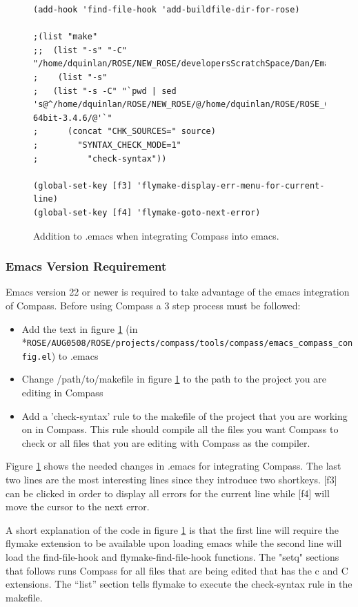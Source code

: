 \begin{figure}
{\begin{verbatim}
(add-hook 'find-file-hook 'add-buildfile-dir-for-rose)

;(list "make"
;;  (list "-s" "-C" "/home/dquinlan/ROSE/NEW_ROSE/developersScratchSpace/Dan/EmacsCompass_tests/"
;    (list "-s"
;   (list "-s -C" "`pwd | sed 's@^/home/dquinlan/ROSE/NEW_ROSE/@/home/dquinlan/ROSE/ROSE_CompileTree/LINUX-64bit-3.4.6/@'`"
;	   (concat "CHK_SOURCES=" source)
;	     "SYNTAX_CHECK_MODE=1"
;		   "check-syntax"))

(global-set-key [f3] 'flymake-display-err-menu-for-current-line)
(global-set-key [f4] 'flymake-goto-next-error)

\end{verbatim}
}
\caption{Addition to .emacs when integrating Compass into emacs. }
\label{compassEmacs}
\end{figure}

\subsubsection{Emacs Version Requirement}

Emacs version 22 or newer is required to take advantage of the emacs integration of
Compass. Before using Compass a 3 step process must be followed:
\begin{itemize}
   \item Add the text in figure \ref{compassEmacs} (in \\*{\tt ROSE/AUG0508/ROSE/projects/compass/tools/compass/emacs\_compass\_config.el}) to .emacs
   \item Change /path/to/makefile in figure \ref{compassEmacs} to the path to the project you are editing in Compass
   \item Add a 'check-syntax' rule to the makefile of the project that you are working
   on in Compass. This rule should compile all the files you want Compass to check 
   or all files that you are editing with Compass as the compiler.
\end{itemize}

Figure \ref{compassEmacs} shows the needed changes in .emacs for integrating
Compass. The last two lines are the most interesting lines since they introduce two
shortkeys. [f3] can be clicked in order to display all errors for the current line while
[f4] will move the cursor to the next error. 

A short explanation of the code in figure \ref{compassEmacs} is that the first line will require 
the flymake extension to be available upon
loading emacs while the second line will load the find-file-hook and flymake-find-file-hook
functions. The "setq" sections that follows runs Compass for all files that are being edited
that has the c and C extensions. The ``list'' section tells flymake to execute the check-syntax
rule in the makefile. 

